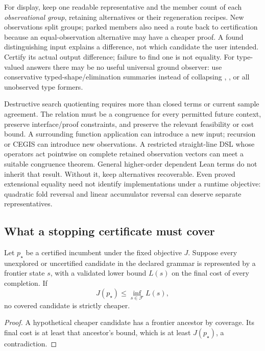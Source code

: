 For display, keep one readable representative and the member count of each \emph{observational group}, retaining alternatives or their regeneration recipes. New observations split groups; parked members also need a route back to certification because an equal-observation alternative may have a cheaper proof. A found distinguishing input explains a difference, not which candidate the user intended. Certify its actual output difference; failure to find one is not equality. For type-valued answers there may be no useful universal ground observer: use conservative typed-shape/elimination summaries instead of collapsing , , or all unobserved type formers.

Destructive search quotienting requires more than closed terms or current sample agreement. The relation must be a congruence for every permitted future context, preserve interface/proof constraints, and preserve the relevant feasibility or cost bound. A surrounding function application can introduce a new input; recursion or CEGIS can introduce new observations. A restricted straight-line DSL whose operators act pointwise on complete retained observation vectors can meet a suitable congruence theorem. General higher-order dependent Lean terms do not inherit that result. Without it, keep alternatives recoverable. Even proved extensional equality need not identify implementations under a runtime objective: quadratic fold reversal and linear accumulator reversal can deserve separate representatives.

\subsection{What a stopping certificate must cover}\label{sec:ranking-stopping}

\begin{proposition}\label{prop:ranking-stop}
Let $p_\star$ be a certified incumbent under the fixed objective $J$. Suppose every unexplored or uncertified candidate in the declared grammar is represented by a frontier state $s$, with a validated lower bound $L(s)$ on the final cost of every completion. If
\[
 J(p_\star)\le\inf_{s\in\mathcal F}L(s),
\]
no covered candidate is strictly cheaper.
\end{proposition}
\begin{proof}
A hypothetical cheaper candidate has a frontier ancestor by coverage. Its final cost is at least that ancestor's bound, which is at least $J(p_\star)$, a contradiction.
\end{proof}

